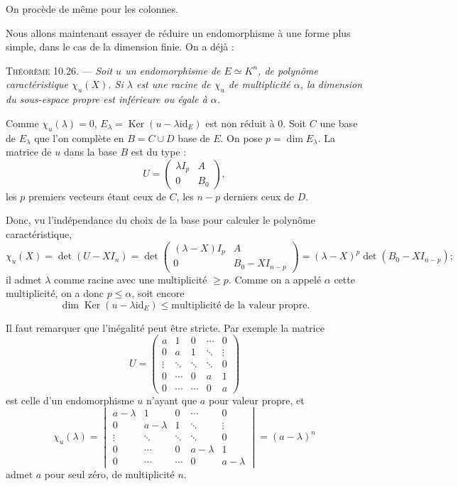 On procède de même pour les colonnes.

Nous allons maintenant essayer de réduire un endomorphisme à une forme plus simple, dans le cas de la dimension finie. On a déjà :

\medskip\noindent\textsc{Théorème 10.26.} --- \emph{Soit $u$ un endomorphisme de $E\simeq K^n$, de polynôme caractéristique $\chi_u(X)$. Si $\lambda$ est une racine de $\chi_u$ de multiplicité $\alpha$, la dimension du sous-espace propre  est inférieure ou égale à $\alpha$.}

Comme $\chi_u(\lambda)=0$, $E_\lambda=\operatorname{Ker}(u-\lambda\mathrm{id}_E)$ est non réduit à 0. Soit $C$ une base de $E_\lambda$ que l'on complète en $B=C\cup D$ base de $E$. On pose $p=\dim E_\lambda$. La matrice de $u$ dans la base $B$ est du type :
\[
U=
\begin{pmatrix}
\lambda I_p&A\\
0&B_0
\end{pmatrix},
\]
les $p$ premiers vecteurs étant ceux de $C$, les $n-p$ derniers ceux de $D$.

Donc, vu l'indépendance du choix de la base pour calculer le polynôme caractéristique,
\[
\chi_u(X)=\det(U-XI_n)
=\det\begin{pmatrix}
(\lambda-X)I_p&A\\
0&B_0-XI_{n-p}
\end{pmatrix}
=(\lambda-X)^p\det(B_0-XI_{n-p});
\]
il admet $\lambda$ comme racine avec une multiplicité $\ge p$. Comme on a appelé $\alpha$ cette multiplicité, on a donc $p\le\alpha$, soit encore
\[
\dim\operatorname{Ker}(u-\lambda\mathrm{id}_E)\le\text{multiplicité de la valeur propre}.
\]
\bookend

Il faut remarquer que l'inégalité peut être stricte. Par exemple la matrice
\[
U=
\begin{pmatrix}
a&1&0&\cdots&0\\
0&a&1&\ddots&\vdots\\
\vdots&\ddots&\ddots&\ddots&0\\
0&\cdots&0&a&1\\
0&\cdots&\cdots&0&a
\end{pmatrix}
\]
est celle d'un endomorphisme $u$ n'ayant que $a$ pour valeur propre, et
\[
\chi_u(\lambda)=
\begin{vmatrix}
a-\lambda&1&0&\cdots&0\\
0&a-\lambda&1&\ddots&\vdots\\
\vdots&\ddots&\ddots&\ddots&0\\
0&\cdots&0&a-\lambda&1\\
0&\cdots&\cdots&0&a-\lambda
\end{vmatrix}
=(a-\lambda)^n
\]
admet $a$ pour seul zéro, de multiplicité $n$.


